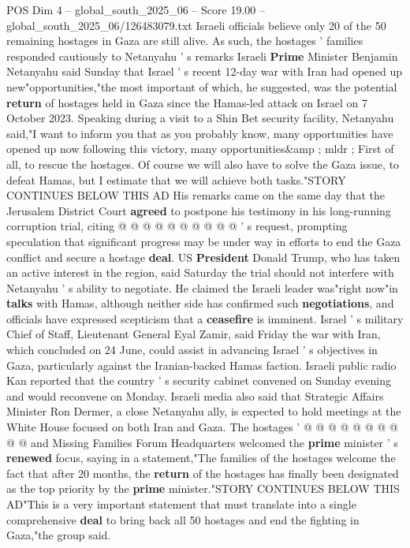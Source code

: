 \begin{textsample}{POS Dim 4 – global\_south\_2025\_06 – Score 19.00 – global\_south\_2025\_06/126483079.txt}  \label{ex:f4_pos_359}
Israeli officials believe only 20 of the 50 remaining hostages in Gaza are still alive.
As such, the hostages ' families responded cautiously to Netanyahu ' s remarks Israeli \textbf{Prime} Minister Benjamin Netanyahu said Sunday that Israel ' s recent 12-day war with Iran had opened up new"opportunities,"the most important of which, he suggested, was the potential \textbf{return} of hostages held in Gaza since the Hamas-led attack on Israel on 7 October 2023.
Speaking during a visit to a Shin Bet security facility, Netanyahu said,"I want to inform you that as you probably know, many opportunities have opened up now following this victory, many opportunities\&amp ; mldr ; First of all, to rescue the hostages.
Of course we will also have to solve the Gaza issue, to defeat Hamas, but I estimate that we will achieve both tasks."STORY CONTINUES BELOW THIS AD His remarks came on the same day that the Jerusalem District Court \textbf{agreed} to postpone his testimony in his long-running corruption trial, citing @ @ @ @ @ @ @ @ @ @ ' s request, prompting speculation that significant progress may be under way in efforts to end the Gaza conflict and secure a hostage \textbf{deal}.
US \textbf{President} Donald Trump, who has taken an active interest in the region, said Saturday the trial should not interfere with Netanyahu ' s ability to negotiate.
He claimed the Israeli leader was"right now"in \textbf{talks} with Hamas, although neither side has confirmed such \textbf{negotiations}, and officials have expressed scepticism that a \textbf{ceasefire} is imminent.
Israel ' s military Chief of Staff, Lieutenant General Eyal Zamir, said Friday the war with Iran, which concluded on 24 June, could assist in advancing Israel ' s objectives in Gaza, particularly against the Iranian-backed Hamas faction.
Israeli public radio Kan reported that the country ' s security cabinet convened on Sunday evening and would reconvene on Monday.
Israeli media also said that Strategic Affairs Minister Ron Dermer, a close Netanyahu ally, is expected to hold meetings at the White House focused on both Iran and Gaza.
The hostages ' @ @ @ @ @ @ @ @ @ @ and Missing Families Forum Headquarters welcomed the \textbf{prime} minister ' s \textbf{renewed} focus, saying in a statement,"The families of the hostages welcome the fact that after 20 months, the \textbf{return} of the hostages has finally been designated as the top priority by the \textbf{prime} minister."STORY CONTINUES BELOW THIS AD"This is a very important statement that must translate into a single comprehensive \textbf{deal} to bring back all 50 hostages and end the fighting in Gaza,"the group said.

\end{textsample}
